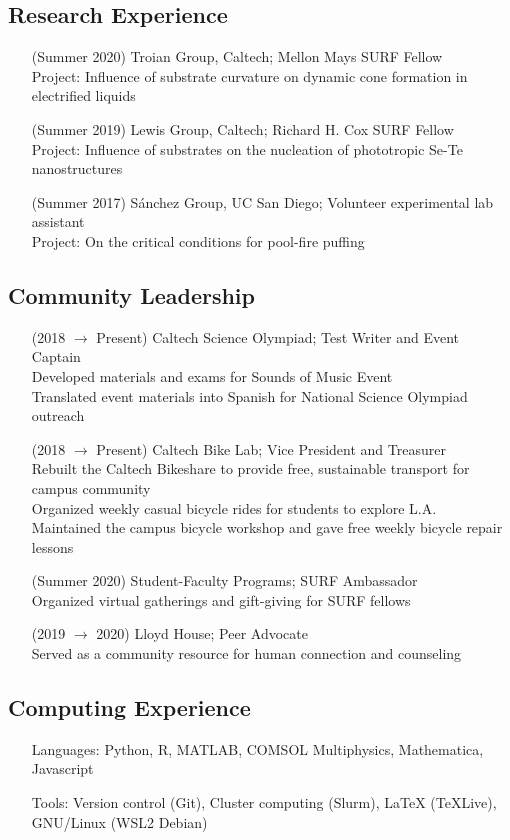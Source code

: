 \documentclass{article}
\begin{document}
\nocite{*}
\printbibliography[title={Publications}, heading=subbibliography]


\subsection*{Research Experience}

\begin{enumerate}
    \item [(Summer 2020)] Troian Group, Caltech; Mellon Mays SURF Fellow \\
        Project: Influence of substrate curvature on dynamic cone formation in electrified liquids
    \item [(Summer 2019)] Lewis Group, Caltech; Richard H. Cox SURF Fellow \\
        Project: Influence of substrates on the nucleation of phototropic Se-Te nanostructures
    \item [(Summer 2017)] Sánchez Group, UC San Diego; Volunteer experimental lab assistant \\
        Project: On the critical conditions for pool-fire puffing
\end{enumerate}


\subsection*{Community Leadership}

\begin{enumerate}
    \item [(2018 $\to$ Present)] Caltech Science Olympiad; Test Writer and Event Captain \\
        Developed materials and exams for Sounds of Music Event \\
        Translated event materials into Spanish for National Science Olympiad outreach
    \item [(2018 $\to$ Present)] Caltech Bike Lab; Vice President and Treasurer \\
        Rebuilt the Caltech Bikeshare to provide free, sustainable transport for campus community \\
        Organized weekly casual bicycle rides for students to explore L.A. \\
        Maintained the campus bicycle workshop and gave free weekly bicycle repair lessons
    \item [(Summer 2020)] Student-Faculty Programs; SURF Ambassador \\
        Organized virtual gatherings and gift-giving for SURF fellows
    \item [(2019 $\to$ 2020)] Lloyd House; Peer Advocate \\
        Served as a community resource for human connection and counseling
\end{enumerate}


\subsection*{Computing Experience}

\begin{enumerate}
	\item [Languages:] Python, R, MATLAB, COMSOL Multiphysics, Mathematica, Javascript
	\item [Tools:] Version control (Git), Cluster computing (Slurm), LaTeX (TeXLive), GNU/Linux (WSL2 Debian)
\end{enumerate}
\end{document}
